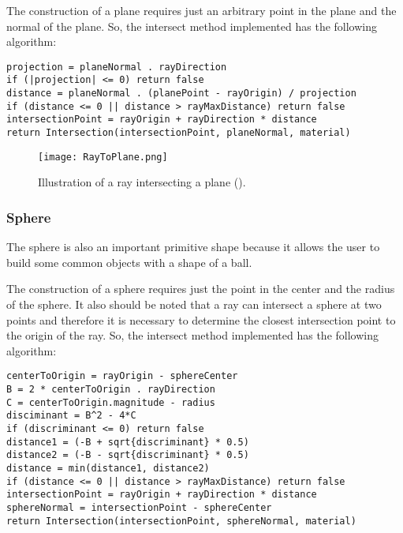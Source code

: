 \par
The construction of a plane requires just an arbitrary point in the plane and the normal of the plane.
So, the intersect method implemented has the following algorithm:

\begin{lstlisting}[caption={Algorithm of Ray plane intersection}, captionpos=b, label=Plane]
projection = planeNormal . rayDirection
if (|projection| <= 0) return false
distance = planeNormal . (planePoint - rayOrigin) / projection
if (distance <= 0 || distance > rayMaxDistance) return false
intersectionPoint = rayOrigin + rayDirection * distance
return Intersection(intersectionPoint, planeNormal, material)
\end{lstlisting}


\begin{figure}[H]
	\centering
	\caption{Illustration of a ray intersecting a plane (\cite{PlaneRayIntersection}).}
	\label{Plane.}
	\texttt{[image: RayToPlane.png]}
\end{figure}

\subsubsection{Sphere}

\par
The sphere is also an important primitive shape because it allows the user to build some common objects with a shape of a ball.

\par
The construction of a sphere requires just the point in the center and the radius of the sphere.
It also should be noted that a ray can intersect a sphere at two points and therefore it is necessary to determine the closest intersection point to the origin of the ray.
So, the intersect method implemented has the following algorithm:

\begin{lstlisting}[caption={Algorithm of Ray sphere intersection}, captionpos=b, label=Sphere]
centerToOrigin = rayOrigin - sphereCenter
B = 2 * centerToOrigin . rayDirection
C = centerToOrigin.magnitude - radius
disciminant = B^2 - 4*C
if (discriminant <= 0) return false
distance1 = (-B + sqrt{discriminant} * 0.5)
distance2 = (-B - sqrt{discriminant} * 0.5)
distance = min(distance1, distance2)
if (distance <= 0 || distance > rayMaxDistance) return false
intersectionPoint = rayOrigin + rayDirection * distance
sphereNormal = intersectionPoint - sphereCenter
return Intersection(intersectionPoint, sphereNormal, material)
\end{lstlisting}

